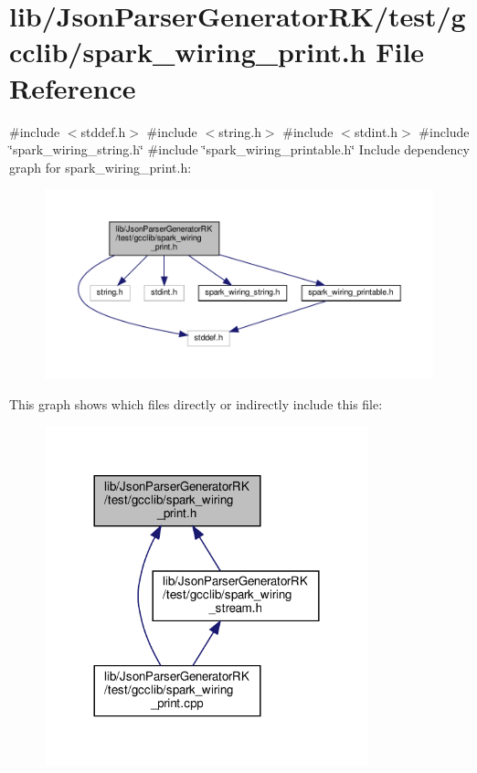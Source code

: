 \section{lib/\+Json\+Parser\+Generator\+R\+K/test/gcclib/spark\+\_\+wiring\+\_\+print.h File Reference}
\label{test_2gcclib_2spark__wiring__print_8h}
{\ttfamily \#include $<$stddef.\+h$>$}\newline
{\ttfamily \#include $<$string.\+h$>$}\newline
{\ttfamily \#include $<$stdint.\+h$>$}\newline
{\ttfamily \#include \char`\"{}spark\+\_\+wiring\+\_\+string.\+h\char`\"{}}\newline
{\ttfamily \#include \char`\"{}spark\+\_\+wiring\+\_\+printable.\+h\char`\"{}}\newline
Include dependency graph for spark\+\_\+wiring\+\_\+print.\+h\+:\nopagebreak
\begin{figure}[H]
\begin{center}
\leavevmode
\includegraphics[width=350pt]{test_2gcclib_2spark__wiring__print_8h__incl}
\end{center}
\end{figure}
This graph shows which files directly or indirectly include this file\+:\nopagebreak
\begin{figure}[H]
\begin{center}
\leavevmode
\includegraphics[width=264pt]{test_2gcclib_2spark__wiring__print_8h__dep__incl}
\end{center}
\end{figure}
